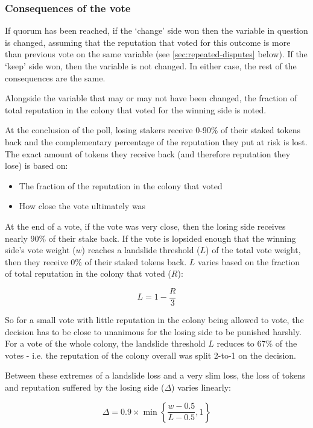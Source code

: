 \subsubsection{Consequences of the vote}
If quorum has been reached, if the `change' side won then the variable in question is changed, assuming that the reputation that voted for this outcome is more than previous vote on the same variable (see \ref{sec:repeated-disputes} below). If the `keep' side won, then the variable is not changed. In either case, the rest of the consequences are the same.

Alongside the variable that may or may not have been changed, the fraction of total reputation in the colony that voted for the winning side is noted. 

At the conclusion of the poll, losing stakers receive 0-90\% of their staked tokens back and the complementary percentage of the reputation they put at risk is lost. The exact amount of tokens they receive back (and therefore reputation they lose) is based on:

\begin{itemize}
 \item The fraction of the reputation in the colony that voted
 \item How close the vote ultimately was
\end{itemize}

At the end of a vote, if the vote was very close, then the losing side receives nearly 90\% of their stake back. If the vote is lopsided enough that the winning side's vote weight ($w$) reaches a landslide threshold ($L$) of the total vote weight, then they receive 0\% of their staked tokens back. $L$ varies based on the fraction of total reputation in the colony that voted ($R$):

\[
L = 1 - \frac{R}{3}
\]

So for a small vote with little reputation in the colony being allowed to vote, the decision has to be close to unanimous for the losing side to be punished harshly. For a vote of the whole colony, the landslide threshold $L$ reduces to 67\% of the votes - i.e. the reputation of the colony overall was split 2-to-1 on the decision.

Between these extremes of a landslide loss and a very slim loss, the loss of tokens and reputation suffered by the losing side ($\Delta$) varies linearly:

\[
 \Delta = 0.9 \times \min \left\lbrace \frac{w-0.5}{L-0.5}, 1 \right\rbrace
\]


